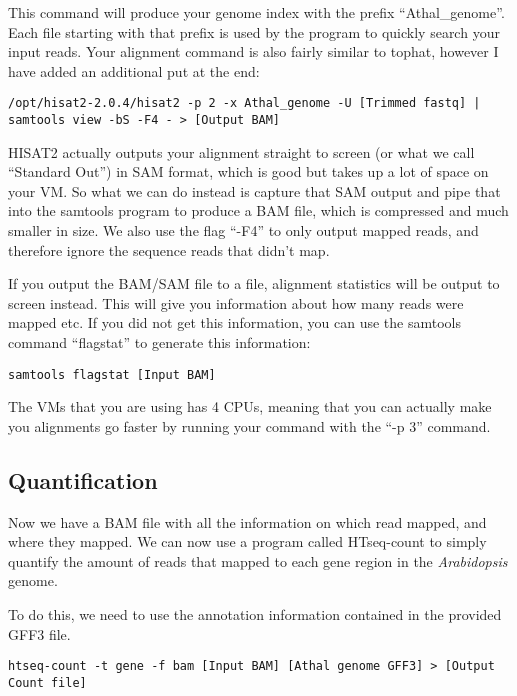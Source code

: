This command will produce your genome index with the prefix
``Athal\_genome''. Each file starting with that prefix is used by the
program to quickly search your input reads. Your alignment command is
also fairly similar to tophat, however I have added an additional put at
the end:

\begin{verbatim}
/opt/hisat2-2.0.4/hisat2 -p 2 -x Athal_genome -U [Trimmed fastq] | samtools view -bS -F4 - > [Output BAM]
\end{verbatim}

HISAT2 actually outputs your alignment straight to screen (or what we
call ``Standard Out'') in SAM format, which is good but takes up a lot
of space on your VM. So what we can do instead is capture that SAM
output and pipe that into the samtools program to produce a BAM file,
which is compressed and much smaller in size. We also use the flag
``-F4'' to only output mapped reads, and therefore ignore the sequence
reads that didn't map.

If you output the BAM/SAM file to a file, alignment statistics will be
output to screen instead. This will give you information about how many
reads were mapped etc. If you did not get this information, you can use
the samtools command ``flagstat'' to generate this information:

\begin{verbatim}
samtools flagstat [Input BAM]
\end{verbatim}

The VMs that you are using has 4 CPUs, meaning that you can actually
make you alignments go faster by running your command with the ``-p 3''
command.

\subsection{Quantification}\label{quantification}

Now we have a BAM file with all the information on which read mapped,
and where they mapped. We can now use a program called HTseq-count to
simply quantify the amount of reads that mapped to each gene region in
the \emph{Arabidopsis} genome.

To do this, we need to use the annotation information contained in the
provided GFF3 file.

\begin{verbatim}
htseq-count -t gene -f bam [Input BAM] [Athal genome GFF3] > [Output Count file]
\end{verbatim}

